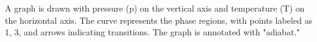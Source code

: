 A graph is drawn with pressure (p) on the vertical axis and temperature (T) on the horizontal axis. The curve represents the phase regions, with points labeled as 1, 3, and arrows indicating transitions. The graph is annotated with "adiabat."